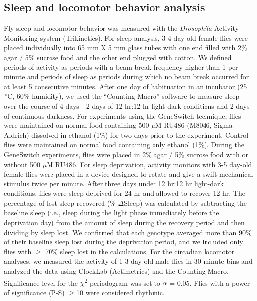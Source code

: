 \subsection*{Sleep and locomotor behavior analysis}

Fly sleep and locomotor behavior was measured with the \emph{Drosophila} Activity Monitoring system (Trikinetics).
For sleep analysis, 3-4 day-old female flies were placed individually into 65 mm X 5 mm glass tubes with one end filled with 2\% agar / 5\% sucrose food and the other end plugged with cotton.
We defined periods of activity as periods with a beam break frequency higher than 1 per minute and periods of sleep as periods during which no beam break occurred for at least 5 consecutive minutes\cite{Shaw:2000ui}.
After one day of habituation in an incubator (25$\,^{\circ}\mathrm{C}$, 60\% humidity), we used the ``Counting Macro'' software\cite{pfeiffenberger:2010ab} to measure sleep over the course of 4 days---2 days of 12 hr:12 hr light-dark conditions and 2 days of continuous darkness.
For experiments using the GeneSwitch technique, flies were maintained on normal food containing 500 $\mu$M RU486 (M8046, Sigma-Aldrich) dissolved in ethanol (1\%) for two days prior to the experiment.
Control flies were maintained on normal food containing only ethanol (1\%).
During the GeneSwitch experiments, flies were placed in 2\% agar / 5\% sucrose food with or without 500 $\mu$M RU486.
For sleep deprivation, activity monitors with 3-5 day-old female flies were placed in a device designed to rotate and give a swift mechanical stimulus twice per minute.
After three days under 12 hr:12 hr light-dark conditions, flies were sleep-deprived for 24 hr and allowed to recover 12 hr.
The percentage of lost sleep recovered (\% $\Delta$Sleep) was calculated by subtracting the baseline sleep (i.e., sleep during the light phase immediately before the deprivation day) from the amount of sleep during the recovery period and then dividing by sleep lost.
We confirmed that each genotype averaged more than 90\% of their baseline sleep lost during the deprivation period, and we included only flies with $\geq$ 70\% sleep lost in the calculations.
For the circadian locomotor analyses, we measured the activity of 1-3 day-old male flies in 30 minute bins and analyzed the data using ClockLab (Actimetrics) and the Counting Macro\cite{pfeiffenberger:2010aa}. Significance level for the $\chi$\textsuperscript{2} periodogram was set to $\alpha$ = 0.05.
Flies with a power of significance (P-S) $\geq$10 were considered rhythmic.

  